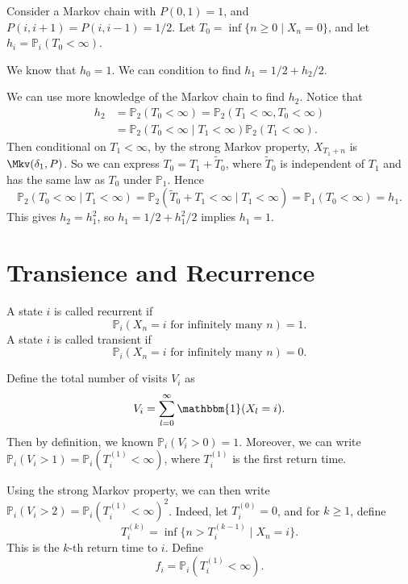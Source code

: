 \documentclass[12pt]{article}
\begin{document}
\begin{exbox}
	Consider a Markov chain with $P(0, 1) = 1$, and $P(i, i+1) = P(i, i-1) = 1/2$. Let $T_0 = \inf\{n \geq 0 \mid X_n = 0\}$, and let $h_i = \mathbb{P}_i(T_0 < \infty)$.

	We know that $h_0 = 1$. We can condition to find $h_1 = 1/2 + h_2/2$.

	We can use more knowledge of the Markov chain to find $h_2$. Notice that
	\begin{align*}
		h_2 &= \mathbb{P}_2(T_0 < \infty) = \mathbb{P}_2(T_1 < \infty, T_0 < \infty) \\
		    &= \mathbb{P}_2(T_0 < \infty \mid T_1 < \infty) \mathbb{P}_2(T_1 < \infty).
	\end{align*}
	Then conditional on $T_1 < \infty$, by the strong Markov property, $X_{T_1 + n}$ is $\Mkv(\delta_1, P)$. So we can express $T_0 = T_1 + \tilde T_0$, where $\tilde T_0$ is independent of $T_1$ and has the same law as $T_0$ under $\mathbb{P}_1$. Hence
	\[
		\mathbb{P}_2(T_0 < \infty \mid T_1 < \infty) = \mathbb{P}_2(\tilde T_0 + T_1 < \infty \mid T_1 < \infty) = \mathbb{P}_1(T_0 < \infty) = h_1
	.\]
	This gives $h_2 = h_1^2$, so $h_1 = 1/2 +h_1^2/2$ implies $h_1 = 1$.
\end{exbox}

\section{Transience and Recurrence}%
\label{sec:transience_and_recurrence}

\begin{definition}
	A state $i$ is called recurrent if
	\[
		\mathbb{P}_i(X_n = i \text{ for infinitely many } n) = 1
	.\]
	A state $i$ is called transient if
	\[
		\mathbb{P}_i(X_n = i \text{ for infinitely many } n) = 0
	.\]
\end{definition}

Define the total number of visits $V_i$ as
\[
	V_i = \sum_{l = 0}^{\infty} \mathbbm{1}(X_l = i)
.\]
Then by definition, we known $\mathbb{P}_i(V_i > 0) = 1$. Moreover, we can write $\mathbb{P}_i(V_i > 1) = \mathbb{P}_i(T_i^{(1)} < \infty)$, where $T_i^{(1)}$ is the first return time.

Using the strong Markov property, we can then write $\mathbb{P}_i(V_i > 2) = \mathbb{P}_i(T_i^{(1)} < \infty)^2$. Indeed, let $T_i^{(0)} = 0$, and for $k \geq 1$, define 
\[
	T_i^{(k)} = \inf\{n > T_i^{(k-1)} \mid X_n = i\}
.\]
This is the $k$-th return time to $i$. Define
\[
	f_i = \mathbb{P}_i(T_i^{(1)} < \infty)
.\]
\end{document}
